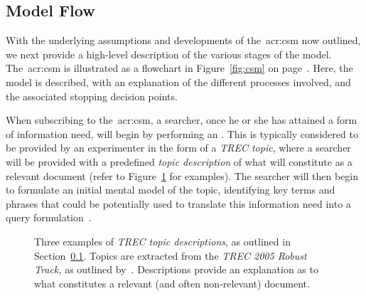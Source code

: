\subsection{Model Flow}\label{sec:proposal:csm:flow}
With the underlying assumptions and developments of the~\gls{acr:csm} now outlined, we next provide a high-level description of the various stages of the model. The~\gls{acr:csm} is illustrated as a flowchart in Figure~\ref{fig:csm} on page~\pageref{fig:csm}. Here, the model is described, with an explanation of the different processes involved, and the associated stopping decision points.

When subscribing to the~\gls{acr:csm}, a searcher, once he or she has attained a form of information need, will begin by performing an . This is typically considered to be provided by an experimenter in the form of a \emph{TREC topic}, where a searcher will be provided with a predefined \emph{topic description} of what will constitute as a relevant document (refer to Figure~\ref{fig:topics} for examples). The searcher will then begin to formulate an initial mental model of the topic, identifying key terms and phrases that could be potentially used to translate this information need into a query formulation~\citep{borlund2003iir_model}.

\begin{figure}[t!]
    \centering
    \caption[Examples of TREC Topics]{Three examples of \emph{TREC topic descriptions}, as outlined in Section~\ref{sec:proposal:csm:flow}. Topics are extracted from the \emph{TREC 2005 Robust Track,} as outlined by~\cite{voorhees2006trec_robust}. Descriptions provide an explanation as to what constitutes a relevant (and often non-relevant) document.}
    \label{fig:topics}
\end{figure}

